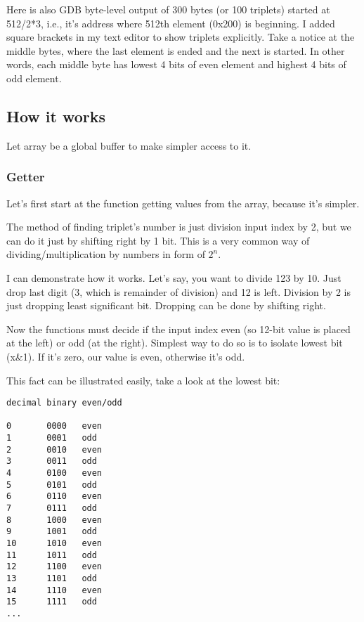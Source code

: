 Here is also GDB byte-level output of 300 bytes (or 100 triplets) started at 512/2*3, i.e., it's address where 512th element (0x200) is beginning.
I added square brackets in my text editor to show triplets explicitly.
Take a notice at the middle bytes, where the last element is ended and the next is started.
In other words, each middle byte has lowest 4 bits of even element and highest 4 bits of odd element.



\subsection{How it works}

Let array be a global buffer to make simpler access to it.

\subsubsection{Getter}

Let's first start at the function getting values from the array, because it's simpler.

The method of finding triplet's number is just division input index by 2, but we can do it just by shifting right by 1 bit.
This is a very common way of dividing/multiplication by numbers in form of $2^n$.

I can demonstrate how it works. Let's say, you want to divide 123 by 10.
Just drop last digit (3, which is remainder of division) and 12 is left.
Division by 2 is just dropping least significant bit. Dropping can be done by shifting right.

Now the functions must decide if the input index even (so 12-bit value is placed at the left) or odd (at the right).
Simplest way to do so is to isolate lowest bit (x\&1). If it's zero, our value is even, otherwise it's odd.

This fact can be illustrated easily, take a look at the lowest bit:

\begin{lstlisting}
decimal binary even/odd

0       0000   even
1       0001   odd
2       0010   even
3       0011   odd
4       0100   even
5       0101   odd
6       0110   even
7       0111   odd
8       1000   even
9       1001   odd
10      1010   even
11      1011   odd
12      1100   even
13      1101   odd
14      1110   even
15      1111   odd
...
\end{lstlisting}

